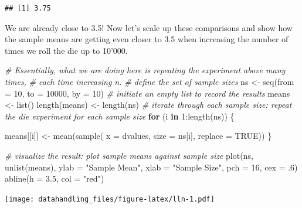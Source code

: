 \documentclass[
  12pt,
]{style/krantz}
\newenvironment{Shaded}{\begin{snugshade}}{\end{snugshade}}
\newcommand{\AttributeTok}[1]{\textcolor[rgb]{0.77,0.63,0.00}{#1}}
\newcommand{\CommentTok}[1]{\textcolor[rgb]{0.56,0.35,0.01}{\textit{#1}}}
\newcommand{\ConstantTok}[1]{\textcolor[rgb]{0.00,0.00,0.00}{#1}}
\newcommand{\ControlFlowTok}[1]{\textcolor[rgb]{0.13,0.29,0.53}{\textbf{#1}}}
\newcommand{\DecValTok}[1]{\textcolor[rgb]{0.00,0.00,0.81}{#1}}
\newcommand{\FloatTok}[1]{\textcolor[rgb]{0.00,0.00,0.81}{#1}}
\newcommand{\FunctionTok}[1]{\textcolor[rgb]{0.00,0.00,0.00}{#1}}
\newcommand{\NormalTok}[1]{#1}
\newcommand{\OtherTok}[1]{\textcolor[rgb]{0.56,0.35,0.01}{#1}}
\newcommand{\SpecialCharTok}[1]{\textcolor[rgb]{0.00,0.00,0.00}{#1}}
\newcommand{\StringTok}[1]{\textcolor[rgb]{0.31,0.60,0.02}{#1}}
\begin{document}
\begin{verbatim}
## [1] 3.75
\end{verbatim}

We are already close to 3.5! Now let's scale up these comparisons and show how the sample means are getting even closer to 3.5 when increasing the number of times we roll the die up to 10'000.

\begin{Shaded}
\begin{Highlighting}[]
\CommentTok{\# Essentially, what we are doing here is repeating the experiment above many times, }
\CommentTok{\# each time increasing n.}
\CommentTok{\# define the set of sample sizes}
\NormalTok{ns }\OtherTok{\textless{}{-}} \FunctionTok{seq}\NormalTok{(}\AttributeTok{from =} \DecValTok{10}\NormalTok{, }\AttributeTok{to =} \DecValTok{10000}\NormalTok{, }\AttributeTok{by =} \DecValTok{10}\NormalTok{)}
\CommentTok{\# initiate an empty list to record the results}
\NormalTok{means }\OtherTok{\textless{}{-}} \FunctionTok{list}\NormalTok{()}
\FunctionTok{length}\NormalTok{(means) }\OtherTok{\textless{}{-}} \FunctionTok{length}\NormalTok{(ns)}
\CommentTok{\# iterate through each sample size: \textquotesingle{}repeat the die experiment for each sample size\textquotesingle{}}
\ControlFlowTok{for}\NormalTok{ (i }\ControlFlowTok{in} \DecValTok{1}\SpecialCharTok{:}\FunctionTok{length}\NormalTok{(ns)) \{}
     
\NormalTok{     means[[i]] }\OtherTok{\textless{}{-}} \FunctionTok{mean}\NormalTok{(}\FunctionTok{sample}\NormalTok{( }\AttributeTok{x =}\NormalTok{ dvalues,}
                                \AttributeTok{size =}\NormalTok{ ns[i],}
                                \AttributeTok{replace =} \ConstantTok{TRUE}\NormalTok{))}
\NormalTok{\}}

\CommentTok{\# visualize the result: plot sample means against sample size}
\FunctionTok{plot}\NormalTok{(ns, }\FunctionTok{unlist}\NormalTok{(means),}
     \AttributeTok{ylab =} \StringTok{"Sample Mean"}\NormalTok{,}
     \AttributeTok{xlab =} \StringTok{"Sample Size"}\NormalTok{,}
     \AttributeTok{pch =} \DecValTok{16}\NormalTok{,}
     \AttributeTok{cex =}\NormalTok{ .}\DecValTok{6}\NormalTok{)}
\FunctionTok{abline}\NormalTok{(}\AttributeTok{h =} \FloatTok{3.5}\NormalTok{, }\AttributeTok{col =} \StringTok{"red"}\NormalTok{)}
\end{Highlighting}
\end{Shaded}

\texttt{[image: datahandling\_files/figure-latex/lln-1.pdf]}
\end{document}
